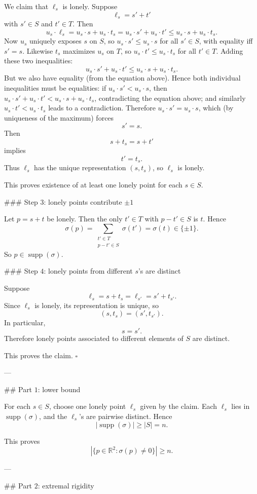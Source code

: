 We claim that \(\ell_s\) is lonely. Suppose
\[
\ell_s=s'+t'
\]
with \(s'\in S\) and \(t'\in T\). Then
\[
u_s\cdot \ell_s
=
u_s\cdot s+u_s\cdot t_s
=
u_s\cdot s'+u_s\cdot t'
\le
u_s\cdot s+u_s\cdot t_s.
\]
Now \(u_s\) uniquely exposes \(s\) on \(S\), so \(u_s\cdot s'\le u_s\cdot s\) for all \(s'\in S\), with equality iff \(s'=s\). Likewise \(t_s\) maximizes \(u_s\) on \(T\), so \(u_s\cdot t'\le u_s\cdot t_s\) for all \(t'\in T\). Adding these two inequalities:
\[
u_s\cdot s'+u_s\cdot t'\le u_s\cdot s+u_s\cdot t_s.
\]
But we also have equality (from the equation above). Hence both individual inequalities must be equalities: if \(u_s\cdot s' < u_s\cdot s\), then \(u_s\cdot s'+u_s\cdot t' < u_s\cdot s+u_s\cdot t_s\), contradicting the equation above; and similarly \(u_s\cdot t' < u_s\cdot t_s\) leads to a contradiction. Therefore \(u_s\cdot s'=u_s\cdot s\), which (by uniqueness of the maximum) forces
\[
s'=s.
\]
Then
\[
s+t_s=s+t'
\]
implies
\[
t'=t_s.
\]
Thus \(\ell_s\) has the unique representation \((s,t_s)\), so \(\ell_s\) is lonely.

This proves existence of at least one lonely point for each \(s\in S\).

### Step \(3\): lonely points contribute \(\pm 1\)

Let \(p=s+t\) be lonely. Then the only \(t'\in T\) with \(p-t'\in S\) is \(t\). Hence
\[
\sigma(p)
=
\sum_{\substack{t'\in T\\ p-t'\in S}} \sigma(t')
=
\sigma(t)\in\{\pm 1\}.
\]
So \(p\in\operatorname{supp}(\sigma)\).

### Step \(4\): lonely points from different \(s\)'s are distinct

Suppose
\[
\ell_s=s+t_s=\ell_{s'}=s'+t_{s'}.
\]
Since \(\ell_s\) is lonely, its representation is unique, so
\[
(s,t_s)=(s',t_{s'}).
\]
In particular,
\[
s=s'.
\]
Therefore lonely points associated to different elements of \(S\) are distinct.

This proves the claim. \(\square\)

---

## Part \(1\): lower bound

For each \(s\in S\), choose one lonely point \(\ell_s\) given by the claim. Each \(\ell_s\) lies in \(\operatorname{supp}(\sigma)\), and the \(\ell_s\)'s are pairwise distinct. Hence
\[
|\operatorname{supp}(\sigma)|\ge |S|=n.
\]

This proves
\[
|\{p\in\mathbb{R}^2:\sigma(p)\neq 0\}|\ge n.
\]

---

## Part \(2\): extremal rigidity


